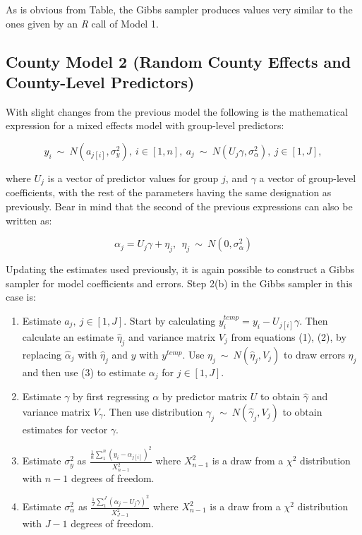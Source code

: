 \documentclass[12pt,twoside]{reedthesis}
\begin{document}
  As is obvious from Table, the Gibbs sampler produces values very similar
  to the ones given by an \textit{R} call of Model 1.
  
  \subsection{County Model 2 (Random County Effects and County-Level
  Predictors)}\label{county-model-2-random-county-effects-and-county-level-predictors}
  
  With slight changes from the previous model the following is the
  mathematical expression for a mixed effects model with group-level
  predictors:
  
  \[y_i \ \sim \ N(a_{j[i]}, \sigma^2_y),\ i \in [1, n], \ a_j \ \sim \ N(U_j\gamma, \sigma^2_{\alpha}), \ j \in [1,J], \]
  
  where \(U_j\) is a vector of predictor values for group \(j\), and
  \(\gamma\) a vector of group-level coefficients, with the rest of the
  parameters having the same designation as previously. Bear in mind that
  the second of the previous expressions can also be written as:
  
  \begin{equation}
  \alpha_j = U_j\gamma + \eta_j, \ \ \eta_j \ \sim \ N(0, \sigma_{\alpha}^2)
  \end{equation}
  
  Updating the estimates used previously, it is again possible to
  construct a Gibbs sampler for model coefficients and errors. Step 2(b)
  in the Gibbs sampler in this case is:
  
  \begin{enumerate}
    \item Estimate $a_j, \ j\in[1,J]$. Start by calculating $y_i^{temp} = y_i - U_{j[i]}\gamma$. Then calculate an estimate $\hat\eta_j$ and variance matrix $V_j$ from equations (1), (2), by replacing $\hat\alpha_j$ with $\hat\eta_j$ and $y$ with $y^{temp}$. Use $\eta_j \ \sim \ N(\hat\eta_j, V_j)$ to draw errors $\eta_j$ and then use (3) to estimate $\alpha_j$ for $j \in [1,J]$.
    \item Estimate $\gamma$ by first regressing $\alpha$ by predictor matrix $U$ to obtain $\hat\gamma$ and variance matrix $V_{\gamma}$. Then use distribution $\gamma_j \ \sim \ N(\hat\gamma_j, V_j)$ to obtain estimates for vector $\gamma$.
    \item Estimate $\sigma_y^2$ as $\frac{\frac{1}{n}\sum_{1}^{n}(y_i - \alpha_{j[i]})^2}{X_{n-1}^2}$ where $X_{n-1}^2$ is a draw from a $\chi^2$ distribution with $n-1$ degrees of freedom.
    \item Estimate $\sigma_{\alpha}^2$ as $\frac{\frac{1}{J}\sum_{1}^{J}(\alpha_j - U_j\gamma)^2}{X_{J-1}^2}$ where $X_{n-1}^2$ is a draw from a $\chi^2$ distribution with $J-1$ degrees of freedom.
  \end{enumerate}
  
\end{document}
